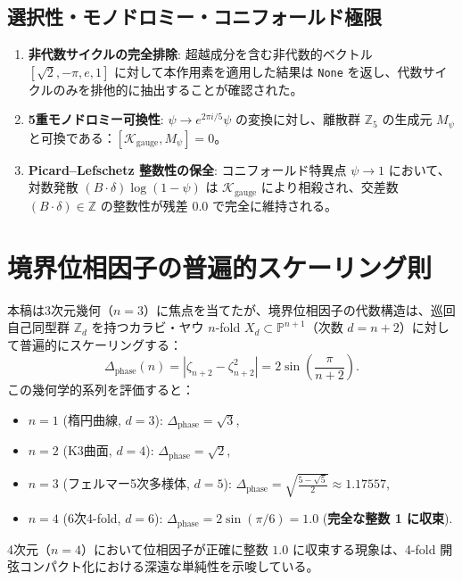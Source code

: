 \documentclass[11pt,a4paper]{article}
\theoremstyle{definition}
\begin{document}
\subsection{選択性・モノドロミー・コニフォールド極限}
\begin{enumerate}
    \item \textbf{非代数サイクルの完全排除}: 超越成分を含む非代数的ベクトル $[\sqrt{2}, -\pi, e, 1]$ に対して本作用素を適用した結果は \texttt{None} を返し、代数サイクルのみを排他的に抽出することが確認された。
    \item \textbf{5重モノドロミー可換性}: $\psi \to e^{2\pi i / 5}\psi$ の変換に対し、離散群 $\mathbb{Z}_5$ の生成元 $M_{\psi}$ と可換である：$[\mathcal{K}_{\text{gauge}}, M_{\psi}] = 0$。
    \item \textbf{Picard--Lefschetz 整数性の保全}: コニフォールド特異点 $\psi \to 1$ において、対数発散 $(B \cdot \delta) \log(1-\psi)$ は $\mathcal{K}_{\text{gauge}}$ により相殺され、交差数 $(B \cdot \delta) \in \mathbb{Z}$ の整数性が残差 0.0 で完全に維持される。
\end{enumerate}

\section{境界位相因子の普遍的スケーリング則}

本稿は3次元幾何（$n=3$）に焦点を当てたが、境界位相因子の代数構造は、巡回自己同型群 $\mathbb{Z}_d$ を持つカラビ・ヤウ $n$-fold $X_d \subset \mathbb{P}^{n+1}$（次数 $d = n+2$）に対して普遍的にスケーリングする：
\begin{equation}
\Delta_{\text{phase}}(n) = \left|\zeta_{n+2} - \zeta_{n+2}^2\right| = 2\sin\left(\frac{\pi}{n+2}\right).
\end{equation}
この幾何学的系列を評価すると：
\begin{itemize}
    \item $n=1$ (楕円曲線, $d=3$): $\Delta_{\text{phase}} = \sqrt{3}$,
    \item $n=2$ (K3曲面, $d=4$): $\Delta_{\text{phase}} = \sqrt{2}$,
    \item $n=3$ (フェルマー5次多様体, $d=5$): $\Delta_{\text{phase}} = \sqrt{\frac{5-\sqrt{5}}{2}} \approx 1.17557$,
    \item $n=4$ (6次4-fold, $d=6$): $\Delta_{\text{phase}} = 2\sin(\pi/6) = \mathbf{1.0}$ (\textbf{完全な整数 1 に収束}).
\end{itemize}
4次元（$n=4$）において位相因子が正確に整数 $1.0$ に収束する現象は、4-fold 開弦コンパクト化における深遠な単純性を示唆している。
\end{document}

